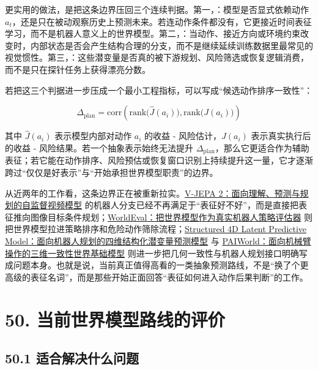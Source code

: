 更实用的做法，是把这条边界压回三个连续判据。第一，\texttt{}：模型是否显式依赖动作 \(a_t\)，还是只在被动观察历史上预测未来。若连动作条件都没有，它更接近时间表征学习，而不是机器人意义上的世界模型。第二，\texttt{}：当动作、接近方向或环境约束改变时，内部状态是否会产生结构合理的分支，而不是继续延续训练数据里最常见的视觉惯性。第三，\texttt{}：这些潜变量是否真的被下游规划、风险筛选或恢复逻辑消费，而不是只在探针任务上获得漂亮分数。

若把这三个判据进一步压成一个最小工程指标，可以写成“候选动作排序一致性”：

\begingroup
\scriptsize
\begin{equation*}
\Delta_{\text{plan}}
=
\mathrm{corr}
\left(
\mathrm{rank}\bigl(\hat{J}(a_i)\bigr),
\mathrm{rank}\bigl(J(a_i)\bigr)
\right)
\end{equation*}
\endgroup

其中 \(\hat{J}(a_i)\) 表示模型内部对动作 \(a_i\) 的收益 - 风险估计，\(J(a_i)\) 表示真实执行后的收益 - 风险结果。若一个抽象表示始终无法提升 \(\Delta_{\text{plan}}\)，那么它更适合作为辅助表征；若它能在动作排序、风险预估或恢复窗口识别上持续提升这一量，它才逐渐跨过“仅仅是好表示”与“开始承担世界模型职责”的边界。

从近两年的工作看，这条边界正在被重新拉实。\href{https://arxiv.org/abs/2506.09985}{V-JEPA 2：面向理解、预测与规划的自监督视频模型} 的机器人分支已经不再满足于“表征好不好”，而是直接把表征推向图像目标条件规划；\href{https://arxiv.org/abs/2505.19017}{WorldEval：把世界模型作为真实机器人策略评估器} 则把世界模型拉进策略排序和危险动作筛除流程；\href{https://arxiv.org/abs/2607.01166}{Structured 4D Latent Predictive Model：面向机器人规划的四维结构化潜变量预测模型} 与 \href{https://arxiv.org/abs/2606.18375}{PAIWorld：面向机械臂操作的三维一致性世界基础模型} 则进一步把几何一致性与机器人规划接口明确写成问题本身。也就是说，当前真正值得高看的一类抽象预测路线，不是“换了个更高级的表征名词”，而是那些开始正面回答“表征如何进入动作后果判断”的工作。

\section*{50. 当前世界模型路线的评价}

\subsection*{50.1 适合解决什么问题}


